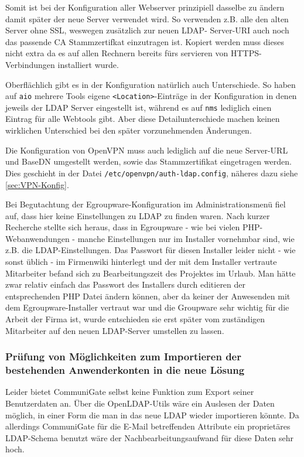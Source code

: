 \documentclass[11pt,a4paper,titlepage=firstiscover,headsepline,bibtotoc]{scrartcl} %
\begin{document}
Somit ist bei der Konfiguration aller Webserver prinzipiell dasselbe zu ändern damit später der neue Server verwendet wird. So verwenden z.B. alle den alten Server ohne SSL, weswegen zusätzlich zur neuen LDAP- Server-URI auch noch das passende CA Stammzertifkat einzutragen ist. Kopiert werden muss dieses nicht extra da es auf allen Rechnern bereits fürs servieren von HTTPS-Verbindungen installiert wurde. 

Oberflächlich gibt es in der Konfiguration natürlich auch Unterschiede. So haben auf \texttt{aio} mehrere Tools eigene \texttt{<Location>}-Einträge in der Konfiguration in denen jeweils der LDAP Server eingestellt ist, während es auf \texttt{nms} lediglich einen Eintrag für alle Webtools gibt. Aber diese Detailunterschiede machen keinen wirklichen Unterschied bei den später vorzunehmenden Änderungen.

Die Konfiguration von OpenVPN muss auch lediglich auf die neue Server-URL und BaseDN umgestellt werden, sowie das Stammzertifikat eingetragen werden. Dies geschieht in der Datei \texttt{/etc/openvpn/auth-ldap.config}, näheres dazu siehe \autoref{sec:VPN-Konfig}.

Bei Begutachtung der Egroupware-Konfiguration im Administrationsmenü fiel auf, dass hier keine Einstellungen zu LDAP zu finden waren. Nach kurzer Recherche stellte sich heraus, dass in Egroupware - wie bei vielen PHP-Webanwendungen - manche Einstellungen nur im Installer vornehmbar sind, wie z.B. die LDAP-Einstellungen. Das Passwort für diesen Installer leider nicht - wie sonst üblich - im Firmenwiki hinterlegt und der mit dem Installer vertraute Mitarbeiter befand sich zu Bearbeitungszeit des Projektes im Urlaub. Man hätte zwar relativ einfach das Passwort des Installers durch editieren der entsprechenden PHP Datei ändern können, aber da keiner der Anwesenden mit dem Egroupware-Installer vertraut war und die Groupware sehr wichtig für die Arbeit der Firma ist, wurde entschieden sie erst später vom zuständigen Mitarbeiter auf den neuen LDAP-Server umstellen zu lassen. 

\subsubsection{Prüfung von Möglichkeiten zum Importieren der bestehenden Anwenderkonten in die neue Lösung} \label{sec:Importsuche}
Leider bietet CommuniGate selbst keine Funktion zum Export seiner Benutzerdaten an. Über die OpenLDAP-Utils wäre ein Auslesen der Daten möglich, in einer Form die man in das neue LDAP wieder importieren könnte. Da allerdings CommuniGate für die E-Mail betreffenden Attribute ein proprietäres LDAP-Schema benutzt wäre der Nachbearbeitungsaufwand für diese Daten sehr hoch. 
\end{document}
